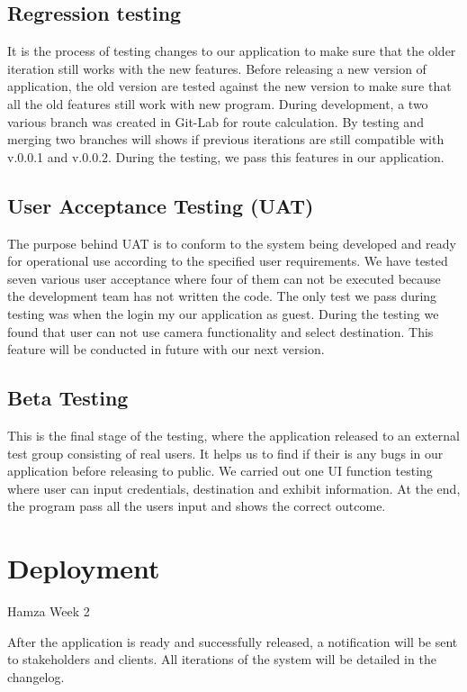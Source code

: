 \subsection{Regression testing}
It is the process of testing changes to our application to make sure that the older iteration still works with the new features. Before releasing a new version of application, the old version are tested against the new version to make sure that all the old features still work with new program. During development, a two various branch was created in Git-Lab for route calculation. By testing and merging two branches will shows if previous iterations are still compatible with v.0.0.1 and v.0.0.2. During the testing, we pass this features in our application.

\subsection{User Acceptance Testing (UAT)}
The purpose behind UAT is to conform to the system being developed and ready for operational use according to the specified user requirements. We have tested seven various user acceptance where four of them can not be executed because the development team has not written the code. The only test we pass during testing was when the login my our application as guest. During the testing we found that user can not use camera functionality and select destination. This feature will be conducted in future with our next version.

\subsection{Beta Testing}
This is the final stage of the testing, where the application released to an external test group consisting of real users. It helps us to find if their is any bugs in our application before releasing to public. We carried out one UI function testing where user can input credentials, destination and exhibit information. At the end, the program pass all the users input and shows the correct outcome.

\section{Deployment}
Hamza Week 2

After the application is ready and successfully released, a notification will be sent to stakeholders and clients. All iterations of the system will be detailed in the changelog.

